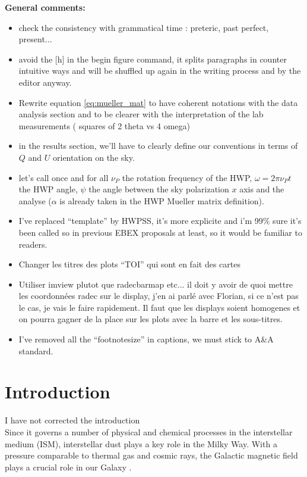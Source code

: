 \documentclass[twocolumn,traditabstract]{aa}
\begin{document}
{\color{blue}
{\bf General comments:}
\begin{itemize}
\item check the consistency with grammatical time : preteric, past perfect,
  present...
\item avoid the [h] in the begin figure command, it splits paragraphs in counter
  intuitive ways and will be shuffled up again in the writing process and by the
  editor anyway.
\item Rewrite equation \ref{eq:mueller_mat} to have coherent notations with the data analysis
  section and to be clearer with the interpretation of the lab measurements (
  squares of 2
  theta vs 4 omega)
\item in the results section, we'll have to clearly define our conventions in
  terms of $Q$ and $U$ orientation on the sky.
\item let's call once and for all $\nu_P$ the rotation frequency of the HWP,
  $\omega = 2\pi\nu_Pt$ the HWP angle, $\psi$ the angle between the sky
  polarization $x$ axis and the analyse ($\alpha$ is already taken in the HWP
  Mueller matrix definition).
\item I've replaced ``template'' by HWPSS, it's more explicite and i'm 99\% sure
  it's been called so in previous EBEX proposals at least, so it would be
  familiar to readers.
\item Changer les titres des plots ``TOI'' qui sont en fait des cartes
\item Utiliser imview plutot que radecbarmap etc... il doit y avoir de quoi
  mettre les coordonn\'ees radec sur le display, j'en ai parl\'e avec Florian,
  si ce n'est pas le cas, je vais le faire rapidement. Il faut que les displays
  soient homogenes et on pourra gagner de la place sur les plots avec la barre
  et les sous-titres.
\item I've removed all the ``footnotesize'' in captions, we must stick to A\&A standard.
\end{itemize}
}
	\section{Introduction}\label{sec:introduction}
{\color{blue} I have not corrected the introduction}\\

	Since it governs a number of physical and chemical processes in the interstellar medium (ISM), interstellar dust plays a key role in the Milky Way. With a pressure comparable to thermal gas and cosmic rays, the Galactic magnetic field plays a crucial role in our Galaxy \citep{planckdust}.
	
\end{document}
